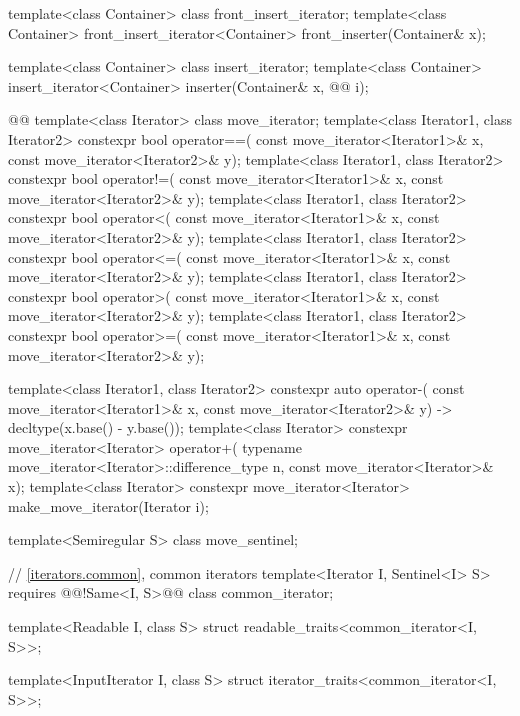 \begin{codeblock}
  template<class Container> class front_insert_iterator;
  template<class Container>
    front_insert_iterator<Container> front_inserter(Container& x);

  template<class Container> class insert_iterator;
  template<class Container>
    insert_iterator<Container> inserter(Container& x, @@ i);

  @@
  template<class Iterator> class move_iterator;
  template<class Iterator1, class Iterator2>
    constexpr bool operator==(
      const move_iterator<Iterator1>& x, const move_iterator<Iterator2>& y);
  template<class Iterator1, class Iterator2>
    constexpr bool operator!=(
      const move_iterator<Iterator1>& x, const move_iterator<Iterator2>& y);
  template<class Iterator1, class Iterator2>
    constexpr bool operator<(
      const move_iterator<Iterator1>& x, const move_iterator<Iterator2>& y);
  template<class Iterator1, class Iterator2>
    constexpr bool operator<=(
      const move_iterator<Iterator1>& x, const move_iterator<Iterator2>& y);
  template<class Iterator1, class Iterator2>
    constexpr bool operator>(
      const move_iterator<Iterator1>& x, const move_iterator<Iterator2>& y);
  template<class Iterator1, class Iterator2>
    constexpr bool operator>=(
      const move_iterator<Iterator1>& x, const move_iterator<Iterator2>& y);

  template<class Iterator1, class Iterator2>
    constexpr auto operator-(
    const move_iterator<Iterator1>& x,
    const move_iterator<Iterator2>& y) -> decltype(x.base() - y.base());
  template<class Iterator>
    constexpr move_iterator<Iterator> operator+(
      typename move_iterator<Iterator>::difference_type n, const move_iterator<Iterator>& x);
  template<class Iterator>
    constexpr move_iterator<Iterator> make_move_iterator(Iterator i);

\end{codeblock}\begin{addedblock}\begin{codeblock}
  template<Semiregular S> class move_sentinel;

  // \ref{iterators.common}, common iterators
  template<Iterator I, Sentinel<I> S>
    requires @\newtxt{(}@!Same<I, S>@\newtxt{)}@
      class common_iterator;

  template<Readable I, class S>
    struct readable_traits<common_iterator<I, S>>;

  template<InputIterator I, class S>
    struct iterator_traits<common_iterator<I, S>>;


\end{codeblock}
\end{addedblock}
